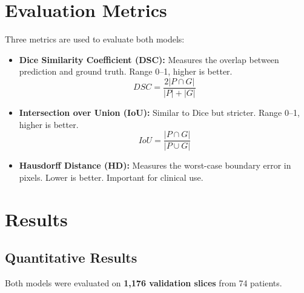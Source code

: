\documentclass[12pt, a4paper]{article}
\begin{document}
\section{Evaluation Metrics}

Three metrics are used to evaluate both models:

\begin{itemize}
    \item \textbf{Dice Similarity Coefficient (DSC):} Measures the overlap between prediction and ground truth. Range 0--1, higher is better.
    \begin{equation}
        DSC = \frac{2 |P \cap G|}{|P| + |G|}
    \end{equation}

    \item \textbf{Intersection over Union (IoU):} Similar to Dice but stricter. Range 0--1, higher is better.
    \begin{equation}
        IoU = \frac{|P \cap G|}{|P \cup G|}
    \end{equation}

    \item \textbf{Hausdorff Distance (HD):} Measures the worst-case boundary error in pixels. Lower is better. Important for clinical use.
\end{itemize}

\section{Results}

\subsection{Quantitative Results}

Both models were evaluated on \textbf{1,176 validation slices} from 74 patients.
\end{document}

